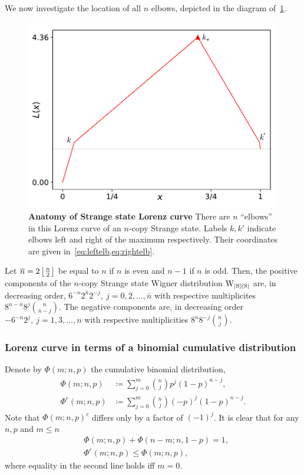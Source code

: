 \documentclass[pra,
aps,
twocolumn,
superscriptaddress,
groupedaddress,
nofootinbib,
reprint
]{revtex4-1}
\begin{document}
We now investigate the location of all $n$ elbows, depicted in the diagram of~\cref{fig:lccalc}.

\begin{figure}
    \centering
    \includegraphics[scale=0.5]{figs/lccalcdiagram.pdf}
    \caption{\textbf{Anatomy of Strange state Lorenz curve}
    There are $n$ ``elbows'' in this Lorenz curve of an $n$-copy Strange state.
    Labels $k, k'$ indicate elbows left and right of the maximum respectively.
    Their coordinates are given in~\cref{eq:leftelb,eq:rightelb}.
    }
    \label{fig:lccalc}
\end{figure}

Let $\overline{n} = 2\left\lfloor \frac{n}{2} \right\rfloor$ be equal to $n$ if $n$ is even and $n-1$ if $n$ is odd.
Then, the positive components of the $n$-copy Strange state Wigner distribution $\W{\ketbra{\rm{S}}}$ are, in decreasing order, $6^{-n} 2^{\bar n} 2^{-j},\ j=0, 2, \dots, \bar n$ with respective multiplicites $8^{n-\bar n} 8^j \binom{n}{\bar n - j}$.
The negative components are, in decreasing order $-6^{-n} 2^j,\ j=1,3, \dots, n$ with respective multiplicities $8^n 8^{-j} \binom{n}{j}$.

\subsubsection{Lorenz curve in terms of a binomial cumulative distribution}

Denote by $\Phi(m; n, p)$ the cumulative binomial distribution,
\begin{align}
	\Phi(m; n, p) &\coloneqq \sum\limits_{j=0}^m \binom{n}{j} p^j (1-p)^{n-j}, \label{eq:phi}\\
	\Phi^c(m; n, p) &\coloneqq \sum\limits_{j=0}^m \binom{n}{j} (-p)^j (1-p)^{n-j}. \label{eq:phic}
\end{align}
Note that $\Phi(m; n, p)^c$ differs only by a factor of $(-1)^j$.
It is clear that for any $n,p$ and $m \leq n$
\begin{align}
	&\Phi(m; n, p) + \Phi(n-m; n, 1-p) = 1, \label{eq:reversef}\\
	&\Phi^c(m; n, p) \leq \Phi(m; n, p),
\end{align}
where equality in the second line holds iff $m=0$.
\end{document}
